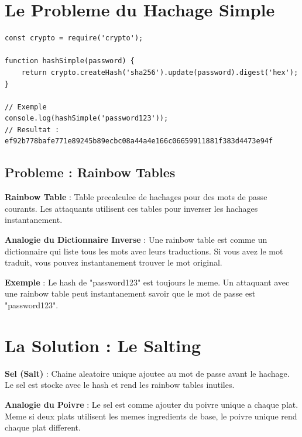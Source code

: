 \documentclass[a4paper,12pt]{book}
\begin{document}
\section{Le Probleme du Hachage Simple}

\begin{lstlisting}[style=javascript, caption=Hachage simple (DECONSEILLE)]
const crypto = require('crypto');

function hashSimple(password) {
    return crypto.createHash('sha256').update(password).digest('hex');
}

// Exemple
console.log(hashSimple('password123'));
// Resultat : ef92b778bafe771e89245b89ecbc08a44a4e166c06659911881f383d4473e94f
\end{lstlisting}

\subsection{Probleme : Rainbow Tables}

\begin{definitionbox}
    \textbf{Rainbow Table} : Table precalculee de hachages pour des mots de passe courants. Les attaquants utilisent ces tables pour inverser les hachages instantanement.
\end{definitionbox}

\begin{analogybox}
    \textbf{Analogie du Dictionnaire Inverse} : Une rainbow table est comme un dictionnaire qui liste tous les mots avec leurs traductions. Si vous avez le mot traduit, vous pouvez instantanement trouver le mot original.
\end{analogybox}

\textbf{Exemple} : Le hash de "password123" est toujours le meme. Un attaquant avec une rainbow table peut instantanement savoir que le mot de passe est "password123".

\section{La Solution : Le Salting}

\begin{definitionbox}
    \textbf{Sel (Salt)} : Chaine aleatoire unique ajoutee au mot de passe avant le hachage. Le sel est stocke avec le hash et rend les rainbow tables inutiles.
\end{definitionbox}

\begin{analogybox}
    \textbf{Analogie du Poivre} : Le sel est comme ajouter du poivre unique a chaque plat. Meme si deux plats utilisent les memes ingredients de base, le poivre unique rend chaque plat different.
\end{analogybox}
\end{document}
